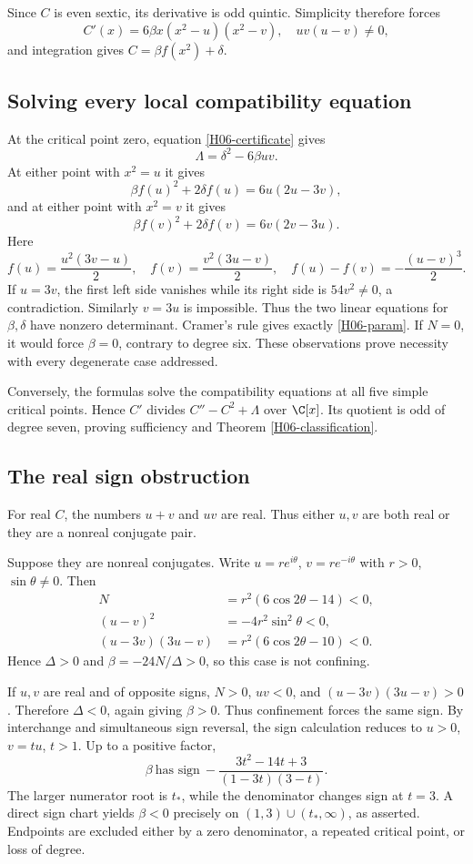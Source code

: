 \documentclass[11pt,a4paper]{article}
\theoremstyle{definition}\newtheorem{definition}[theorem]{Definition}
\theoremstyle{remark}\newtheorem{remark}[theorem]{Remark}
\numberwithin{equation}{section}
\begin{document}
Since $C$ is even sextic, its derivative is odd quintic. Simplicity therefore forces
\[C'(x)=6\beta x(x^2-u)(x^2-v),\quad uv(u-v)\ne0,\]
and integration gives $C=\beta f(x^2)+\delta$.
\subsection{Solving every local compatibility equation}\label{H06-sec-3}
At the critical point zero, equation \eqref{H06-certificate} gives
\[\Lambda=\delta^2-6\beta uv.\]
At either point with $x^2=u$ it gives
\[\beta f(u)^2+2\delta f(u)=6u(2u-3v),\]
and at either point with $x^2=v$ it gives
\[\beta f(v)^2+2\delta f(v)=6v(2v-3u).\]
Here
\[f(u)=\frac{u^2(3v-u)}2,\quad f(v)=\frac{v^2(3u-v)}2,
\quad f(u)-f(v)=-\frac{(u-v)^3}{2}.\]
If $u=3v$, the first left side vanishes while its right side is $54v^2\ne0$, a contradiction. Similarly $v=3u$ is impossible. Thus the two linear equations for $\beta,\delta$ have nonzero determinant. Cramer's rule gives exactly \eqref{H06-param}. If $N=0$, it would force $\beta=0$, contrary to degree six. These observations prove necessity with every degenerate case addressed.

Conversely, the formulas solve the compatibility equations at all five simple critical points. Hence $C'$ divides $C''-C^2+\Lambda$ over $\C[x]$. Its quotient is odd of degree seven, proving sufficiency and Theorem \ref{H06-classification}.
\subsection{The real sign obstruction}\label{H06-sec-4}
For real $C$, the numbers $u+v$ and $uv$ are real. Thus either $u,v$ are both real or they are a nonreal conjugate pair.

Suppose they are nonreal conjugates. Write $u=re^{i\theta}$, $v=re^{-i\theta}$ with $r>0$, $\sin\theta\ne0$. Then
\begin{align*}
N&=r^2(6\cos2\theta-14)<0,\\
(u-v)^2&=-4r^2\sin^2\theta<0,\\
(u-3v)(3u-v)&=r^2(6\cos2\theta-10)<0.
\end{align*}
Hence $\Delta>0$ and $\beta=-24N/\Delta>0$, so this case is not confining.

If $u,v$ are real and of opposite signs, $N>0$, $uv<0$, and $(u-3v)(3u-v)>0$. Therefore $\Delta<0$, again giving $\beta>0$. Thus confinement forces the same sign. By interchange and simultaneous sign reversal, the sign calculation reduces to $u>0$, $v=tu$, $t>1$. Up to a positive factor,
\[\beta\ \text{has sign}\ -\frac{3t^2-14t+3}{(1-3t)(3-t)}.
\]
The larger numerator root is $t_*$, while the denominator changes sign at $t=3$. A direct sign chart yields $\beta<0$ precisely on $(1,3)\cup(t_*,\infty)$, as asserted. Endpoints are excluded either by a zero denominator, a repeated critical point, or loss of degree.
\end{document}
